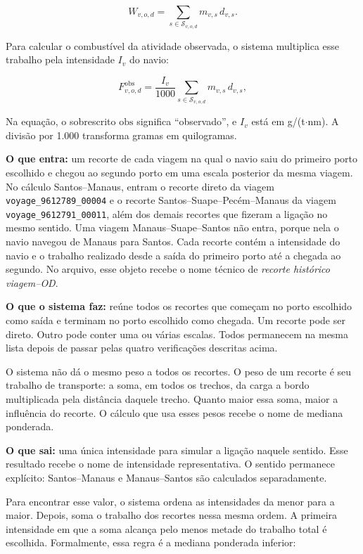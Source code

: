 \documentclass[12pt,a4paper]{article}
\begin{document}
\begin{equation}
W_{v,o,d}=\sum_{s\in\mathcal{S}_{v,o,d}}m_{v,s}\,d_{v,s}.
\label{eq:trabalho-transporte}
\end{equation}

Para calcular o combustível da atividade observada, o sistema multiplica esse trabalho pela intensidade $I_v$ do navio:

\begin{equation}
F_{v,o,d}^{\mathrm{obs}}=\frac{I_v}{1000}
\sum_{s\in\mathcal{S}_{v,o,d}}m_{v,s}\,d_{v,s},
\label{eq:combustivel-observado}
\end{equation}

Na equação, o sobrescrito $\mathrm{obs}$ significa ``observado'', e $I_v$ está em g/(t$\cdot$nm). A divisão por 1.000 transforma gramas em quilogramas.

\textbf{O que entra:} um recorte de cada viagem na qual o navio saiu do primeiro porto escolhido e chegou ao segundo porto em uma escala posterior da mesma viagem. No cálculo Santos--Manaus, entram o recorte direto da viagem \texttt{voyage\_9612789\_00004} e o recorte Santos--Suape--Pecém--Manaus da viagem \texttt{voyage\_9612791\_00011}, além dos demais recortes que fizeram a ligação no mesmo sentido. Uma viagem Manaus--Suape--Santos não entra, porque nela o navio navegou de Manaus para Santos. Cada recorte contém a intensidade do navio e o trabalho realizado desde a saída do primeiro porto até a chegada ao segundo. No arquivo, esse objeto recebe o nome técnico de \emph{recorte histórico viagem--OD}.

\textbf{O que o sistema faz:} reúne todos os recortes que começam no porto escolhido como saída e terminam no porto escolhido como chegada. Um recorte pode ser direto. Outro pode conter uma ou várias escalas. Todos permanecem na mesma lista depois de passar pelas quatro verificações descritas acima.

O sistema não dá o mesmo peso a todos os recortes. O peso de um recorte é seu trabalho de transporte: a soma, em todos os trechos, da carga a bordo multiplicada pela distância daquele trecho. Quanto maior essa soma, maior a influência do recorte. O cálculo que usa esses pesos recebe o nome de mediana ponderada.

\textbf{O que sai:} uma única intensidade para simular a ligação naquele sentido. Esse resultado recebe o nome de intensidade representativa. O sentido permanece explícito: Santos--Manaus e Manaus--Santos são calculados separadamente.

Para encontrar esse valor, o sistema ordena as intensidades da menor para a maior. Depois, soma o trabalho dos recortes nessa mesma ordem. A primeira intensidade em que a soma alcança pelo menos metade do trabalho total é escolhida. Formalmente, essa regra é a mediana ponderada inferior:
\end{document}
